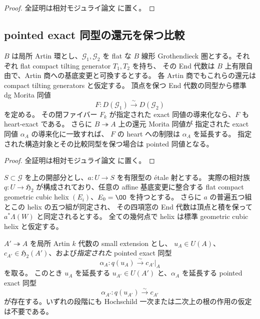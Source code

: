 \begin{proof}
全証明は相対モジュライ論文 \cite[\texttt{cubic_smooth_atlas}]{QuadricModuli2026} に置く。
\end{proof}

\subsection{pointed exact 同型の還元を保つ比較}

\begin{lemma}
\label{lem:artin-two-heart-comparison}
$B$ は局所 Artin 環とし、$\mathcal G_1,\mathcal G_2$ を flat な $B$ 線形
Grothendieck 圏とする。それぞれ flat compact tilting generator $T_1,T_2$ を持ち、
その End 代数は $B$ 上有限自由で、Artin 商への基底変更と可換するとする。
各 Artin 商でもこれらの還元は compact tilting generators と仮定する。
頂点を保つ End 代数の同型から標準 dg Morita 同値
\[
 F:D(\mathcal G_1)\xrightarrow{\sim}D(\mathcal G_2)
\]
を定める。
その閉ファイバー $F_k$ が指定された exact 同値の導来化なら、$F$ も heart-exact である。
さらに $B\twoheadrightarrow A$ 上の還元 Morita 同値が
指定された exact 同値 $\alpha_A$ の導来化に一致すれば、
$F$ の heart への制限は $\alpha_A$ を延長する。
指定された構造対象とその比較同型を保つ場合は pointed 同値となる。
\end{lemma}

\begin{proof}
全証明は相対モジュライ論文 \cite[\texttt{cubic_smooth_atlas}]{QuadricModuli2026} に置く。
\end{proof}

\begin{theorem}
\label{thm:quintuple-chart-artin-lifting}
$S\subset\mathscr G$ を上の開部分とし、$a:U\to S$ を有限型の étale 射とする。
実際の相対族 $q:U\to\mathfrak H_2$ が構成されており、任意の affine 基底変更に整合する
flat compact geometric cubic helix $(E_i)$、$E_0=\OO$ を持つとする。
さらに $a$ の普遍五つ組とこの helix の五つ組が同定され、
その四項窓の End 代数は頂点と積を保って $a^*\Lambda(W)$ と同定されるとする。
全ての幾何点で helix は標準 geometric cubic helix と仮定する。

$A'\twoheadrightarrow A$ を局所 Artin $k$ 代数の small extension とし、
$u_A\in U(A)$、$c_{A'}\in\mathfrak H_2(A')$、および\emph{指定された} pointed exact 同型
\[
 \alpha_A:q(u_A)\xrightarrow{\sim}c_{A'}|_A
\]
を取る。
このとき $u_A$ を延長する $u_{A'}\in U(A')$ と、$\alpha_A$ を延長する pointed exact 同型
\[
 \alpha_{A'}:q(u_{A'})\xrightarrow{\sim}c_{A'}
\]
が存在する。いずれの段階にも Hochschild 一次または二次上の根の作用の仮定は不要である。
\end{theorem}

